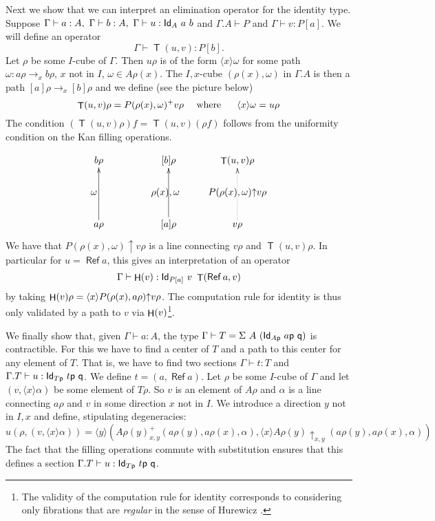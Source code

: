 \documentclass[10pt,a4paper]{article}
\DeclareMathOperator{\Ref}{\mathsf{Ref}}
\DeclareMathOperator{\Transp}{\mathsf{T}}
\DeclareMathOperator{\HH}{{\sf H}}
\newcommand{\Id}{{\sf Id}}
\newcommand{\pp}{{\sf p}}
\newcommand{\qq}{{\sf q}}
\newcommand{\rup}[1]{#1{\uparrow}}
\newcommand{\rupxy}[1]{#1{\uparrow_{x,y}}}
\newcommand{\bind}[2]{{\langle}#1{\rangle}#2}
\begin{document}
Next we show that we can interpret an elimination operator for the
identity type.  Suppose $\Gamma\vdash a:A,~\Gamma\vdash
b:A,~\Gamma\vdash u:\Id_A~a~b$ and $\Gamma.A\vdash P$ and
$\Gamma\vdash v:P[a]$. We will define an operator
$$
\Gamma\vdash \Transp(u,v):P[b].
$$
Let $\rho$ be some $I$-cube of $\Gamma$. Then $u\rho$ is of the form
$\bind{x}{\omega}$ for some path $\omega:a\rho\to _x b\rho$, $x$ not
in $I$, $\omega\in A\rho(x)$.  The $I,x$-cube $(\rho (x),\omega)$ in
$\Gamma.A$ is then a path $[a]\rho\to _x [b]\rho$ and we define (see
the picture below)
$$
\Transp(u,v)\rho = P(\rho (x),\omega)^+ v\rho~~~~{\rm
  where~~~~~}\bind{x}{\omega} = u\rho
$$
The condition $(\Transp(u,v)\rho)f = \Transp(u,v)(\rho f)$ follows
from the uniformity condition on the Kan filling operations.

\[
\xymatrix@R=.6cm@C=.6cm{
b\rho                 &&[b]\rho                    &   \Transp(u,v)\rho                                 \\
\omega ~~~     &&\rho(x),\omega~~  &\rup{P(\rho(x),\omega)} v\rho \\
a\rho\ar[uu]      &&[a]\rho\ar[uu]       &   v\rho\ar@{.>}[uu]                        \\
}
\]
We have that $\rup{P(\rho(x),\omega)} v\rho$ is a line connecting
$v\rho$ and $\Transp(u,v)\rho$.  In particular for $u=\Ref a$, this gives
an interpretation of an operator
$$
\Gamma\vdash \HH(v):\Id_{P[a]}~v~\Transp(\Ref a,v)
$$
by taking $\HH(v)\rho = \bind{x}{\rup{P(\rho (x),a\rho)} v\rho}$.  The
computation rule for identity is thus only validated by a path to $v$
via $\HH(v)$\footnote{The validity of the computation rule for
  identity corresponds to considering only fibrations that are {\em
    regular} in the sense of Hurewicz \cite{hurewicz}.}.


We finally show that, given $\Gamma\vdash a:A$, the type $\Gamma
\vdash T = \Sigma~A~(\Id_{A\pp}~a\pp~\qq)$ is contractible. For this
we have to find a center of $T$ and a path to this center for any
element of $T$.  That is, we have to find two sections $\Gamma\vdash
t:T$ and $\Gamma.T\vdash u:\Id_{T\pp}~t\pp~\qq$.  We define $t =
(a,\Ref a)$. Let $\rho$ be some $I$-cube of $\Gamma$ and let
$(v,\bind{x}{\alpha})$ be some element of $T\rho$. So $v$ is an
element of $A\rho$ and $\alpha$ is a line connecting $a\rho$ and $v$
in some direction $x$ not in $I$. We introduce a direction $y$ not in
$I,x$ and define, stipulating degeneracies:
$$
u(\rho,(v,\bind{x}{\alpha})) = \bind{y}{(A\rho(y)^+ _{x,y}
  (a\rho(y),a\rho(x),\alpha),\bind{x}{\rupxy{A\rho(y)}
    (a\rho(y),a\rho(x),\alpha)})}
$$
The fact that the filling operations commute with substitution ensures
that this defines a section $\Gamma.T\vdash u:\Id_{T\pp}~t\pp~\qq$.
\end{document}
